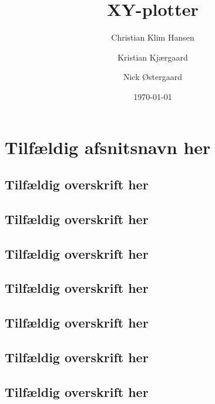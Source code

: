 \documentclass{../mypaper}
\title{XY-plotter}
\author{Christian Klim Hansen \and Kristian Kjærgaard \and Nick Østergaard}
\date{\today}
\begin{document}
\maketitle

\tableofcontents

\chapter{Tilfældig afsnitsnavn her}

\lipsum[1]
{
  \ttfamily
  \lipsum[2]
}
\lipsum[3]

\section{Tilfældig overskrift her}

\lipsum[1-2]

\section{Tilfældig overskrift her}

\lipsum[1-2]

\section{Tilfældig overskrift her}

\lipsum[1-2]

\section{Tilfældig overskrift her}

\lipsum[1-2]

\section{Tilfældig overskrift her}

\lipsum[1-2]

\section{Tilfældig overskrift her}

\lipsum[1-2]

\section{Tilfældig overskrift her}

\lipsum

\listoffigures

\listoftables
\end{document}

